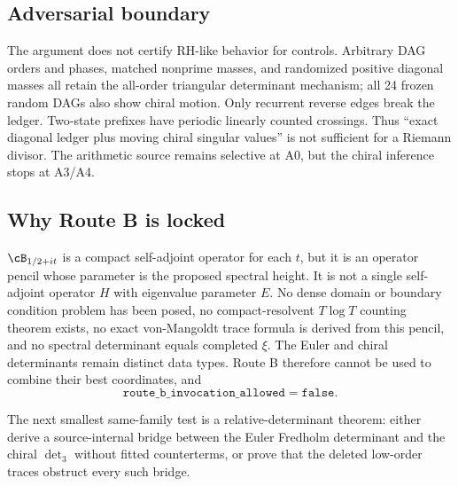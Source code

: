 \subsection{Adversarial boundary}

The argument does not certify RH-like behavior for controls.  Arbitrary DAG
orders and phases, matched nonprime masses, and randomized positive diagonal
masses all retain the all-order triangular determinant mechanism; all 24
frozen random DAGs also show chiral motion.  Only recurrent reverse edges
break the ledger.  Two-state prefixes have
periodic linearly counted crossings.  Thus ``exact diagonal ledger plus
moving chiral singular values'' is not sufficient for a Riemann divisor.
The arithmetic source remains selective at A0, but the chiral inference
stops at A3/A4.

\subsection{Why Route B is locked}

$\cB_{1/2+it}$ is a compact self-adjoint operator for each $t$, but it is an
operator pencil whose parameter is the proposed spectral height.  It is not
a single self-adjoint operator $H$ with eigenvalue parameter $E$.  No dense
domain or boundary condition problem has been posed, no compact-resolvent
$T\log T$ counting theorem exists, no exact von-Mangoldt trace formula is
derived from this pencil, and no spectral determinant equals completed
$\xi$.  The Euler and chiral determinants remain distinct data types.  Route
B therefore cannot be used to combine their best coordinates, and
\[
 \mathtt{route\_b\_invocation\_allowed=false}.
\]

The next smallest same-family test is a relative-determinant theorem: either
derive a source-internal bridge between the Euler Fredholm determinant and
the chiral $\det_3$ without fitted counterterms, or prove that the deleted
low-order traces obstruct every such bridge.
